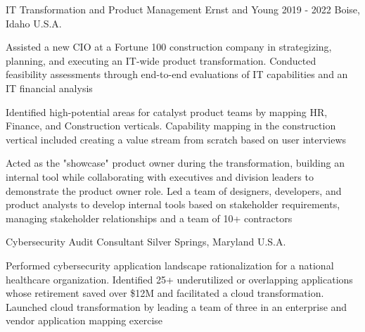 \begin{cventries}
  \cventry
    {IT Transformation and Product Management} %
    {Ernst and Young} %
    {2019 - 2022} %
    {Boise, Idaho U.S.A.} %
    {
      \begin{cvitems} %
        \item {Assisted a new CIO at a Fortune 100 construction company in strategizing, planning, and executing an IT-wide product transformation. Conducted feasibility assessments through end-to-end evaluations of IT capabilities and an IT financial analysis}
        \item {Identified high-potential areas for catalyst product teams by mapping HR, Finance, and Construction verticals. Capability mapping in the construction vertical included creating a value stream from scratch based on user interviews}
        \item {Acted as the "showcase" product owner during the transformation, building an internal tool while collaborating with executives and division leaders to demonstrate the product owner role. Led a team of designers, developers, and product analysts to develop internal tools based on stakeholder requirements, managing stakeholder relationships and a team of 10+ contractors}
      \end{cvitems}
    }

  \cventry
    {Cybersecurity Audit Consultant} %
    {} %
    {} %
    {Silver Springs, Maryland U.S.A.} %
    {
      \begin{cvitems} %
        \item {Performed cybersecurity application landscape rationalization for a national healthcare organization. Identified 25+ underutilized or overlapping applications whose retirement saved over \$12M and facilitated a cloud transformation. Launched cloud transformation by leading a team of three in an enterprise and vendor application mapping exercise}
      \end{cvitems}
    }


\end{cventries}
